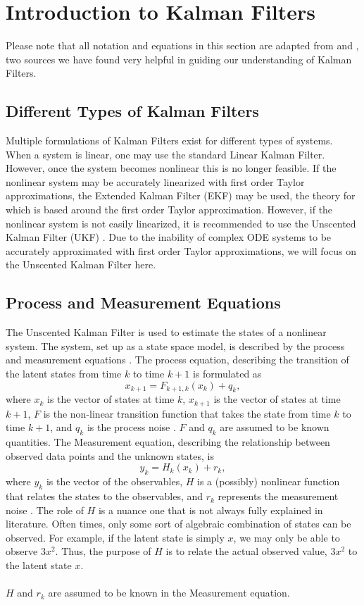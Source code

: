 \documentclass{article}
\begin{document}
\section{Introduction to Kalman Filters}
    Please note that all notation and equations in this section are adapted from \cite{VanMereChapter} and \cite{SimonHaykinText}, two sources we have found very helpful in guiding our understanding of Kalman Filters.
    \subsection{Different Types of Kalman Filters}
    Multiple formulations of Kalman Filters exist for different types of systems. When a system is linear, one may use the standard Linear Kalman Filter. However, once the system becomes nonlinear this is no longer feasible. If the nonlinear system may be accurately linearized with first order Taylor approximations, the Extended Kalman Filter (EKF) may be used, the theory for which is based around the first order Taylor approximation. However, if the nonlinear system  is not easily linearized, it is recommended to use the Unscented Kalman Filter (UKF) \cite{VanMereChapter}. Due to the inability of complex ODE systems to be accurately approximated with first order Taylor approximations, we will focus on the Unscented Kalman Filter here.
    
    \subsection{Process and Measurement Equations}
    The Unscented Kalman Filter is used to estimate the states of a nonlinear system. The system, set up as a state space model, is described by the process and measurement equations \cite{SimonHaykinText}. The process equation, describing the transition of the latent states from time $k$ to time $k+1$ is formulated as
    \begin{equation}
    x_{k+1} = F_{k+1,k}(x_k) + q_k, 
    \end{equation}
    where $x_{k}$ is the vector of states at time $k$, $x_{k+1}$ is the vector of states at time $k+1$, $F$ is the non-linear transition function that takes the state from time $k$ to time $k+1$, and $q_k$ is the process noise \cite{SimonHaykinText}. $F$ and $q_k$ are assumed to be known quantities. The Measurement equation, describing the relationship between observed data points and the unknown states, is 
    \begin{equation}
    y_k = H_k(x_k) + r_k,  
    \end{equation}
    where $y_k$ is the vector of the observables, $H$ is a (possibly) nonlinear function that relates the states to the observables, and $r_k$ represents the measurement noise \cite{SimonHaykinText}. The role of $H$ is a nuance one that is not always fully explained in literature. Often times, only some sort of algebraic combination of states can be observed. For example, if the latent state is simply $x$, we may only be able to observe $3x^2$. Thus, the purpose of $H$ is to relate the actual observed value, $3x^2$ to the latent state $x$.\\
    \\
    $H$ and $r_k$ are assumed to be known in the Measurement equation. 
\end{document}
